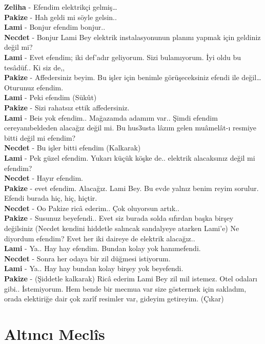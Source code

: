 \documentclass[]{book}
\begin{document}
\textbf{Zeliha} - Efendim elektrikçi gelmiş\ldots{}\\
\textbf{Pakize} - Hah geldi mi söyle gelsin..\\
\textbf{Lami} - Bonjur efendim bonjur..\\
\textbf{Necdet} - Bonjur Lami Bey elektrik instalasyonunun planını yapmak için geldiniz değil mi?\\
\textbf{Lami} - Evet efendim; iki def'adır geliyorum. Sizi bulamıyorum. İyi oldu bu tesâdüf.. Ki siz de,,\\
\textbf{Pakize} - Affedersiniz beyim. Bu işler için benimle görüşeceksiniz efendi ile değil\ldots{} Oturunuz efendim.\\
\textbf{Lami} - Peki efendim (Sükût)\\
\textbf{Pakize} - Sizi rahatsız ettik affedersiniz.\\
\textbf{Lami} - Beis yok efendim.. Mağazamda adamım var.. Şimdi efendim cereyanıbeldeden alacağız değil mi. Bu hus3usta lâzım gelen muâmelât-ı resmiye bitti değil mi efendim?\\
\textbf{Necdet} - Bu işler bitti efendim (Kalkarak)\\
\textbf{Lami} - Pek güzel efendim. Yukarı küçük köşke de.. elektrik alacaksınız değil mi efendim?\\
\textbf{Necdet} - Hayır efendim.\\
\textbf{Pakize} - evet efendim. Alacağız. Lami Bey. Bu evde yalnız benim reyim sorulur. Efendi burada hiç, hiç, hiçtir.\\
\textbf{Necdet} - Oo Pakize ricâ ederim.. Çok oluyorsun artık..\\
\textbf{Pakize} - Susunuz beyefendi.. Evet siz burada solda sıfırdan başka birşey değilsiniz (Necdet kendini hiddetle salıncak sandalyeye atarken Lami'e) Ne diyordum efendim? Evet her iki daireye de elektrik alacağız..\\
\textbf{Lami} - Ya.. Hay hay efendim. Bundan kolay yok hanımefendi.\\
\textbf{Necdet} - Sonra her odaya bir zil düğmesi istiyorum.\\
\textbf{Lami} - Ya.. Hay hay bundan kolay birşey yok beyefendi.\\
\textbf{Pakize} - (Şiddetle kalkarak) Ricâ ederim Lami Bey zil mil istemez. Otel odaları gibi.. İstemiyorum. Hem bende bir mecmua var size göstermek için sakladım, orada elektiriğe dair çok zarîf resimler var, gideyim getireyim. (Çıkar)\\

\hypertarget{altinci-meclis}{%
\section{Altıncı Meclîs}\label{altinci-meclis}}
\end{document}
